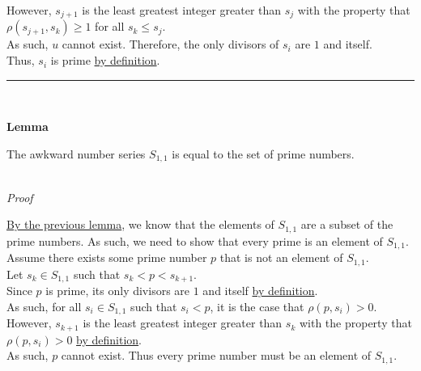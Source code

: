 \documentclass[a4paper,12pt]{article}
\begin{document}
\noindent However, $s_{j + 1}$ is the least greatest integer greater than $s_j$ with the property that $\rho(s_{j + 1}, s_k) \geq 1$ for all $s_k \leq s_j$.\\

\noindent As such, $u$ cannot exist. Therefore, the only divisors of $s_i$ are $1$ and itself.\\

\noindent Thus, $s_i$ is prime \hyperlink{definition:prime_numbers}{by definition}.

\begin{center}
\noindent\rule{8cm}{0.4pt}
\end{center}
\noindent \\






\label{lemma:prime_asn}
\hypertarget{lemma:prime_asn}{}
\begin{tcolorbox}
\textbf{Lemma}

The awkward number series $S_{1, 1}$ is equal to the set of prime numbers.
\end{tcolorbox}

\noindent \\
\textit{Proof}

\noindent \hyperlink{lemma:asn_subset_prime}{By the previous lemma}, we know that the elements of $S_{1, 1}$ are a subset of the prime numbers. As such, we need to show that every prime is an element of $S_{1, 1}$.\\

\noindent Assume there exists some prime number $p$ that is not an element of $S_{1, 1}$.\\

\noindent Let $s_k \in S_{1, 1}$ such that $s_k < p < s_{k + 1}$.\\

\noindent Since $p$ is prime, its only divisors are $1$ and itself \hyperlink{definition:prime_numbers}{by definition}.\\

\noindent As such, for all $s_i \in S_{1, 1}$ such that $s_i < p$, it is the case that $\rho(p, s_i) > 0$.\\

\noindent However, $s_{k + 1}$ is the least greatest integer greater than $s_k$ with the property that $\rho(p, s_i) > 0$ \hyperlink{definition:awkward_number_series}{by definition}.\\

\noindent As such, $p$ cannot exist. Thus every prime number must be an element of $S_{1, 1}$.
\end{document}
